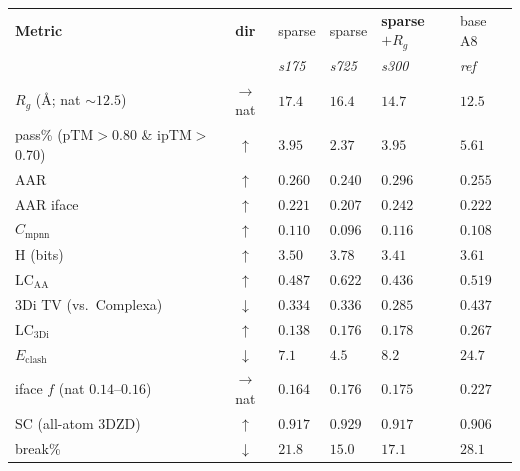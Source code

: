 \documentclass[11pt]{article}
\begin{document}
\begin{table}[htbp]
\centering
\footnotesize
\setlength{\tabcolsep}{5pt}
{\renewcommand{\arraystretch}{1.2}%
\begin{tabular}{@{}>{\raggedright\arraybackslash}p{4.6cm}
                    c
                    >{\centering\arraybackslash}p{1.5cm}
                    >{\centering\arraybackslash}p{1.5cm}
                    >{\centering\arraybackslash}p{1.9cm}
                    >{\centering\arraybackslash}p{1.2cm}@{}}
\toprule
\textbf{Metric} & \textbf{dir} & sparse & sparse & \textbf{sparse$+R_g$} & base A8\\
 & & \emph{s175} & \emph{s725} & \emph{s300} & \emph{ref}\\
\midrule
\rowcolor{aTint}$R_g$ (\AA; nat $\sim\!12.5$)  & $\to$nat     & $17.4$ & $16.4$ & $\mathbf{14.7}$ & $12.5$\\
\midrule
pass\% (pTM$>$0.80 \& ipTM$>$0.70)             & $\uparrow$   & $3.95$ & $2.37$ & $\mathbf{3.95}$ & $5.61$\\
AAR                                            & $\uparrow$   & $0.260$ & $0.240$ & $\mathbf{0.296}$ & $0.255$\\
AAR iface                                      & $\uparrow$   & $0.221$ & $0.207$ & $\mathbf{0.242}$ & $0.222$\\
$C_{\mathrm{mpnn}}$                            & $\uparrow$   & $0.110$ & $0.096$ & $\mathbf{0.116}$ & $0.108$\\
H (bits)                                       & $\uparrow$   & $3.50$ & $\mathbf{3.78}$ & $3.41$ & $3.61$\\
$\mathrm{LC}_{\mathrm{AA}}$                    & $\uparrow$   & $0.487$ & $\mathbf{0.622}$ & $0.436$ & $0.519$\\
3Di TV (vs.\ Complexa)                         & $\downarrow$ & $0.334$ & $0.336$ & $\mathbf{0.285}$ & $0.437$\\
$\mathrm{LC}_{\mathrm{3Di}}$                   & $\uparrow$   & $0.138$ & $0.176$ & $\mathbf{0.178}$ & $0.267$\\
$E_{\mathrm{clash}}$                           & $\downarrow$ & $7.1$ & $\mathbf{4.5}$ & $8.2$ & $24.7$\\
iface $f$ (nat $0.14$--$0.16$)                 & $\to$nat     & $\mathbf{0.164}$ & $0.176$ & $0.175$ & $0.227$\\
SC (all-atom 3DZD)                             & $\uparrow$   & $0.917$ & $\mathbf{0.929}$ & $0.917$ & $0.906$\\
break\%                                        & $\downarrow$ & $21.8$ & $\mathbf{15.0}$ & $17.1$ & $28.1$\\

\end{tabular}}
\end{table}
\end{document}

